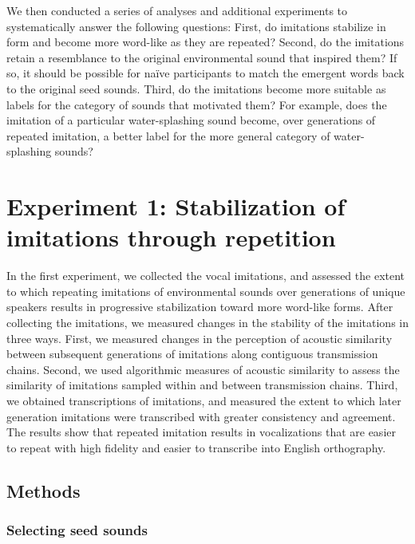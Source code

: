 \documentclass[english,floatsintext,man]{apa6}
\theoremstyle{definition}
\theoremstyle{definition}
\theoremstyle{remark}
\begin{document}
We then conducted a series of analyses and additional experiments to
systematically answer the following questions: First, do imitations
stabilize in form and become more word-like as they are repeated?
Second, do the imitations retain a resemblance to the original
environmental sound that inspired them? If so, it should be possible for
naïve participants to match the emergent words back to the original seed
sounds. Third, do the imitations become more suitable as labels for the
category of sounds that motivated them? For example, does the imitation
of a particular water-splashing sound become, over generations of
repeated imitation, a better label for the more general category of
water-splashing sounds?

\section{Experiment 1: Stabilization of imitations through
repetition}\label{experiment-1-stabilization-of-imitations-through-repetition}

In the first experiment, we collected the vocal imitations, and assessed
the extent to which repeating imitations of environmental sounds over
generations of unique speakers results in progressive stabilization
toward more word-like forms. After collecting the imitations, we
measured changes in the stability of the imitations in three ways.
First, we measured changes in the perception of acoustic similarity
between subsequent generations of imitations along contiguous
transmission chains. Second, we used algorithmic measures of acoustic
similarity to assess the similarity of imitations sampled within and
between transmission chains. Third, we obtained transcriptions of
imitations, and measured the extent to which later generation imitations
were transcribed with greater consistency and agreement. The results
show that repeated imitation results in vocalizations that are easier to
repeat with high fidelity and easier to transcribe into English
orthography.

\subsection{Methods}\label{methods}

\subsubsection{Selecting seed sounds}\label{selecting-seed-sounds}
\end{document}
